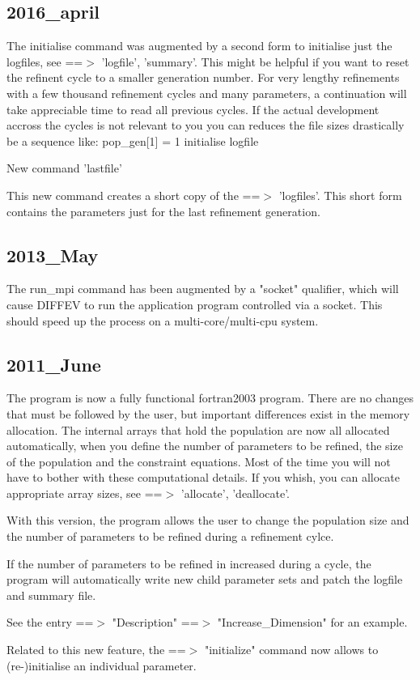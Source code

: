 \subsection*{2016\_april}
\par
The initialise command was augmented by a second form to  initialise 
just the logfiles, see ==$> $ 'logfile', 'summary'. 
This might be helpful if you want to reset the refinent cycle 
to a smaller generation number. For very lengthy refinements with 
a few thousand refinement cycles and many parameters, a continuation 
will take appreciable time to read all previous cycles. If the 
actual development accross the cycles is not relevant to you you 
can reduces the file sizes drastically be a sequence like: 
pop\_gen[1] = 1 
initialise logfile 
\par
New command 'lastfile' 
\par
This new command creates a short copy of the ==$> $ 'logfiles'. 
This short form contains the parameters just for the last 
refinement generation. 
\subsection*{2013\_May}
\par
The run\_mpi command has been augmented by a "socket" qualifier, which 
will cause DIFFEV to run the application program controlled via a 
socket. This should speed up the process on a multi-core/multi-cpu 
system. 
\subsection*{2011\_June}
\par
The program is now a fully functional fortran2003 program. 
There are no changes that must be followed by the user, but important 
differences exist in the memory allocation. The internal arrays that hold 
the population are now all allocated automatically, when you define the 
number of parameters to be refined, the size of the population and the 
constraint equations. Most of the time you will not have to bother with 
these computational details. If you whish, you can allocate appropriate 
array sizes, see ==$> $ 'allocate', 'deallocate'. 
\par
With this version, the program allows the user to change the population 
size and the number of parameters to be refined during a refinement cylce. 
\par
If the number of parameters to be refined in increased during a cycle, 
the program will automatically write new child parameter sets and patch 
the logfile and summary file. 
\par
See the entry ==$> $ "Description" ==$> $ "Increase\_Dimension" for an example. 
\par
Related to this new feature, the ==$> $ "initialize" command now allows to 
(re-)initialise an individual parameter. 
\par
